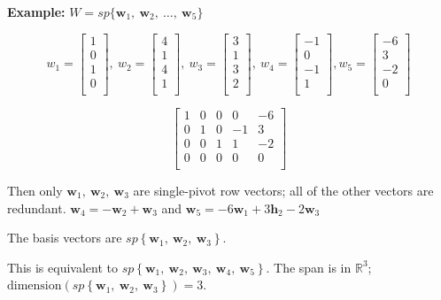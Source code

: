 \documentclass[
]{article}
\begin{document}
\textbf{Example:}
$W = sp\{{\mathbf{w}}_{1},\ {\mathbf{w}}_{2},\ \ldots,\ {\mathbf{w}}_{5}\}$

$$w_{1} = \begin{bmatrix}
1 \\
0 \\
1 \\
0 \\
\end{bmatrix},\ w_{2} = \begin{bmatrix}
4 \\
1 \\
4 \\
1 \\
\end{bmatrix},\ w_{3} = \begin{bmatrix}
3 \\
1 \\
3 \\
2 \\
\end{bmatrix},\ w_{4} = \begin{bmatrix}
 - 1 \\
0 \\
 - 1 \\
1 \\
\end{bmatrix},w_{5} = \begin{bmatrix}
 - 6 \\
3 \\
 - 2 \\
0 \\
\end{bmatrix}\ $$

$$\begin{bmatrix}
1 & 0 & 0 & 0 & - 6 \\
0 & 1 & 0 & - 1 & 3 \\
0 & 0 & 1 & 1 & - 2 \\
0 & 0 & 0 & 0 & 0 \\
\end{bmatrix}\ $$

Then only
${\mathbf{w}}_{1},\ {\mathbf{w}}_{2},\ {\mathbf{w}}_{3}$
are single-pivot row vectors; all of the other vectors are redundant.
${\mathbf{w}}_{4} = - {\mathbf{w}}_{2} + {\mathbf{w}}_{3}$
and
${\mathbf{w}}_{5} = - 6{\mathbf{w}}_{1} + {3\mathbf{h}}_{2} - 2{\mathbf{w}}_{3}$

The basis vectors are
$sp\left\{ {\mathbf{w}}_{1},\ {\mathbf{w}}_{2},\ {\mathbf{w}}_{3} \right\}$.

This is equivalent to
$sp\left\{ {\mathbf{w}}_{1},\ {\mathbf{w}}_{2},\ {\mathbf{w}}_{3},\ {\mathbf{w}}_{4},\ {\mathbf{w}}_{5} \right\}$.
The span is in $\mathbb{R}^{3}$;
$\text{dimension}\left( sp\left\{ {\mathbf{w}}_{1},\ {\mathbf{w}}_{2},\ {\mathbf{w}}_{3} \right\} \right) = 3$.
\end{document}
